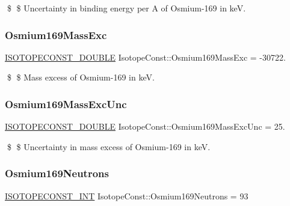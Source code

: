 \$ \$ Uncertainty in binding energy per A of Osmium-\/169 in keV. \mbox{\label{group___isotope_const-_osmium-_os169_ga9d50fd1e23a7a64d4edb28cac2713039}} 
\subsubsection{\texorpdfstring{Osmium169\+Mass\+Exc}{Osmium169MassExc}}
{\footnotesize\ttfamily \mbox{\hyperlink{group___isotope_const-_macros_ga8f45a7272ce02c0b4c65c44636ed719a}{I\+S\+O\+T\+O\+P\+E\+C\+O\+N\+S\+T\+\_\+\+D\+O\+U\+B\+LE}} Isotope\+Const\+::\+Osmium169\+Mass\+Exc = -\/30722.}

\$ \$ Mass excess of Osmium-\/169 in keV. \mbox{\label{group___isotope_const-_osmium-_os169_gaf8edbdc60c5a9ef414ee6ee3bf5f3404}} 
\subsubsection{\texorpdfstring{Osmium169\+Mass\+Exc\+Unc}{Osmium169MassExcUnc}}
{\footnotesize\ttfamily \mbox{\hyperlink{group___isotope_const-_macros_ga8f45a7272ce02c0b4c65c44636ed719a}{I\+S\+O\+T\+O\+P\+E\+C\+O\+N\+S\+T\+\_\+\+D\+O\+U\+B\+LE}} Isotope\+Const\+::\+Osmium169\+Mass\+Exc\+Unc = 25.}

\$ \$ Uncertainty in mass excess of Osmium-\/169 in keV. \mbox{\label{group___isotope_const-_osmium-_os169_ga74404ffda2f9b6e671c1de2a3523dba6}} 
\subsubsection{\texorpdfstring{Osmium169\+Neutrons}{Osmium169Neutrons}}
{\footnotesize\ttfamily \mbox{\hyperlink{group___isotope_const-_macros_ga5f18360b3e99483a35c32d789e62621c}{I\+S\+O\+T\+O\+P\+E\+C\+O\+N\+S\+T\+\_\+\+I\+NT}} Isotope\+Const\+::\+Osmium169\+Neutrons = 93}

